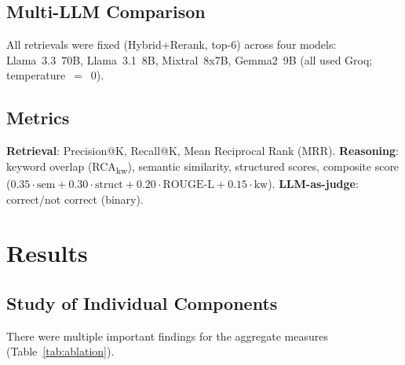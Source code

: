 \documentclass[11pt,a4paper]{article}
\begin{document}
\subsection{Multi-LLM Comparison}

All retrievals were fixed (Hybrid+Rerank, top-6) across four models:
Llama~3.3~70B, Llama~3.1~8B, Mixtral~8x7B, Gemma2~9B (all used
Groq; temperature~$=$~0).

\subsection{Metrics}

\textbf{Retrieval}: Precision@K, Recall@K, Mean Reciprocal Rank (MRR).
\textbf{Reasoning}: keyword overlap (RCA\textsubscript{kw}),
semantic similarity, structured scores, composite score
($0.35{\cdot}\text{sem} + 0.30{\cdot}\text{struct} +
0.20{\cdot}\text{ROUGE-L} + 0.15{\cdot}\text{kw}$).
\textbf{LLM-as-judge}: correct/not correct (binary).


\section{Results}
\label{sec:results}

\subsection{Study of Individual Components}
\label{sec:ablation}

There were multiple important findings for the aggregate measures
(Table~\ref{tab:ablation}).
\end{document}
